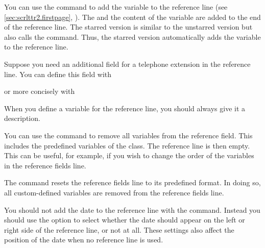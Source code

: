 You can use the  command to add the 
variable to the reference line (see
\autoref{sec:scrlttr2.firstpage}, ). The
 and the content of the variable are added to the end of
the reference line. The starred version  is similar to the
unstarred version but also calls the  command. Thus, the
starred version automatically adds the variable to the reference line.
\begin{Example}
  Suppose you need an additional field for a telephone extension in the
  reference line. You can define this field with
\begin{lstcode}
\end{lstcode}
  or more concisely with
\begin{lstcode}
\end{lstcode}
\end{Example}
When you define a variable for the reference line, you
should always give it a description.

You can use the  command to remove all variables from
the reference field. This includes the predefined variables of the class. The
reference line is then empty. This can be useful, for example, if you wish to
change the order of the variables in the reference fields line.

The  command resets the reference fields line to its
predefined format. In doing so, all custom-defined variables are removed from
the reference fields line.

You should not add the date to the reference line with
the  command. Instead you should use the
%
%
%
%
 option to select whether the date
should appear on the left or right side of the reference line, or not at all.
These settings also affect the position of the date when no reference line is
used.%
%
\EndIndexGroup


